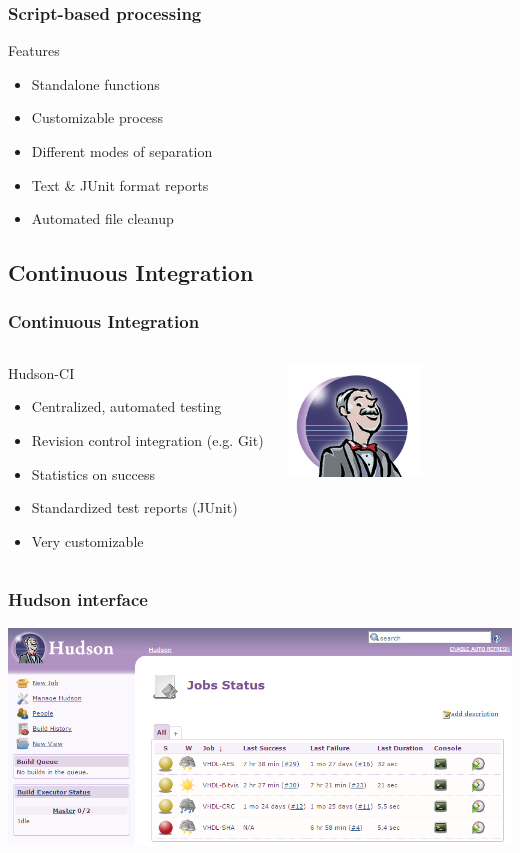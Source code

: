 \documentclass[british,10pt]{beamer}
\begin{document}
\begin{frame}\frametitle{Script-based processing}
Features
\begin{itemize}
\item Standalone functions
\item Customizable process
\item Different modes of separation
\item Text \& JUnit format reports
\item Automated file cleanup
\end{itemize}
\end{frame}

\subsection{Continuous Integration}

\begin{frame}\frametitle{Continuous Integration}
\begin{columns}
\begin{column}{0.6\textwidth}
Hudson-CI
\begin{itemize}
\item Centralized, automated testing
\item Revision control integration (e.g. Git)
\item Statistics on success
\item Standardized test reports (JUnit)
\item Very customizable
\end{itemize}
\end{column}
\includegraphics[width=0.6\textwidth]{images/hudson.png}
\end{columns}
\end{frame}

\begin{frame}\frametitle{Hudson interface}
\centering
\includegraphics[width=\textwidth]{images/hudsoninterface.png}
\end{frame}
\end{document}
